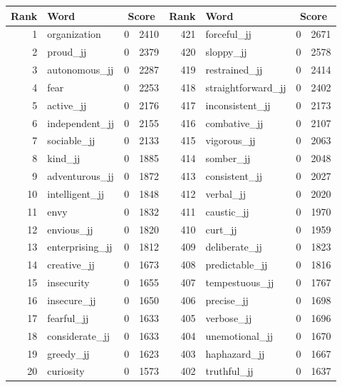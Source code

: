 \begin{table}[tbp]
    \begin{tabular}{| rlr@{.}l | rlr@{.}l |}
    \hline
    \textbf{Rank} & \textbf{Word} & \multicolumn{2}{c|}{\textbf{Score}} & \textbf{Rank} & \textbf{Word} & \multicolumn{2}{c|}{\textbf{Score}} \\
    \hline
    1 & organization & 0 & 2410    &    421 & forceful\_jj & 0 & 2671 \\
    2 & proud\_jj & 0 & 2379    &    420 & sloppy\_jj & 0 & 2578 \\
    3 & autonomous\_jj & 0 & 2287    &    419 & restrained\_jj & 0 & 2414 \\
    4 & fear & 0 & 2253    &    418 & straightforward\_jj & 0 & 2402 \\
    5 & active\_jj & 0 & 2176    &    417 & inconsistent\_jj & 0 & 2173 \\
    6 & independent\_jj & 0 & 2155    &    416 & combative\_jj & 0 & 2107 \\
    7 & sociable\_jj & 0 & 2133    &    415 & vigorous\_jj & 0 & 2063 \\
    8 & kind\_jj & 0 & 1885    &    414 & somber\_jj & 0 & 2048 \\
    9 & adventurous\_jj & 0 & 1872    &    413 & consistent\_jj & 0 & 2027 \\
    10 & intelligent\_jj & 0 & 1848    &    412 & verbal\_jj & 0 & 2020 \\
    11 & envy & 0 & 1832    &    411 & caustic\_jj & 0 & 1970 \\
    12 & envious\_jj & 0 & 1820    &    410 & curt\_jj & 0 & 1959 \\
    13 & enterprising\_jj & 0 & 1812    &    409 & deliberate\_jj & 0 & 1823 \\
    14 & creative\_jj & 0 & 1673    &    408 & predictable\_jj & 0 & 1816 \\
    15 & insecurity & 0 & 1655    &    407 & tempestuous\_jj & 0 & 1767 \\
    16 & insecure\_jj & 0 & 1650    &    406 & precise\_jj & 0 & 1698 \\
    17 & fearful\_jj & 0 & 1633    &    405 & verbose\_jj & 0 & 1696 \\
    18 & considerate\_jj & 0 & 1633    &    404 & unemotional\_jj & 0 & 1670 \\
    19 & greedy\_jj & 0 & 1623    &    403 & haphazard\_jj & 0 & 1667 \\
    20 & curiosity & 0 & 1573    &    402 & truthful\_jj & 0 & 1637 \\

\end{tabular}
\end{table}
